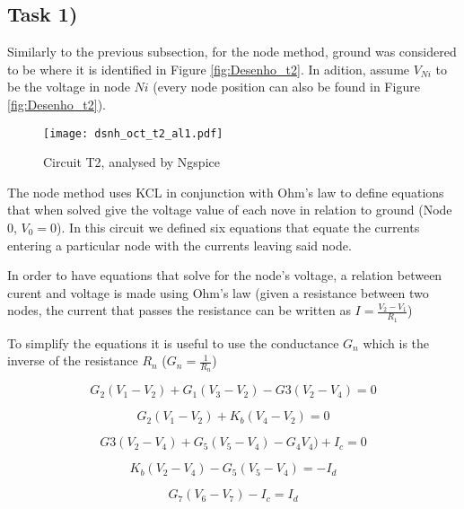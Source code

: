 \subsection{Task 1)}
\label{subsec:task1_a}


Similarly to the previous subsection, for the node method, ground was considered to be where it is identified in
Figure \ref{fig:Desenho_t2}. In adition, assume $V_{Ni}$ to be the voltage in node $Ni$ (every node position can
also be found in Figure \ref{fig:Desenho_t2}). \\

\begin{figure}[ht]
	\centering
	\texttt{[image: dsnh\_oct\_t2\_al1.pdf]}
	\caption{Circuit T2, analysed by Ngspice}
\label{fig:Dsnh_sim_t2}
\end{figure}


The node method uses KCL in conjunction with Ohm’s law to define equations that when solved give the voltage value 
of each nove in relation to ground (Node 0, $V_0 = 0$). In this circuit we defined six equations that equate the 
currents entering a particular node with the currents leaving said node. 

In order to have equations that solve for the node’s voltage, a relation between curent and voltage is made using 
Ohm’s law (given a resistance between two nodes, the current that passes the resistance can be written as 
$I=\frac{V_2-V_1}{R_1}$)

To simplify the equations it is useful to use the conductance $G_n$ which is the inverse of the resistance $R_n$ 
($G_n=\frac{1}{R_n}$)

\begin{equation}
	G_2(V_1-V_2)+G_1(V_3-V_2) - G3(V_2-V_4) = 0
	\label{}
\end{equation}

\begin{equation}
	G_2(V_1-V_2)+K_b(V_4-V_2) = 0
	\label{}
\end{equation}

\begin{equation}
	G3(V_2-V_4)+G_5(V_5-V_4)-G_4V_4)+I_c=0
	\label{}
\end{equation} 

\begin{equation}
	K_b(V_2-V_4)-G_5(V_5-V_4)=-I_d
	\label{}
\end{equation}

\begin{equation}
	G_7(V_6-V_7)-I_c=I_d
	\label{}
\end{equation}

